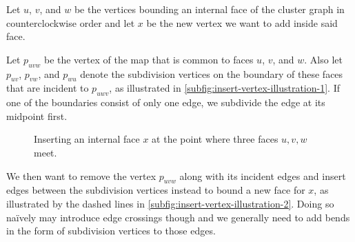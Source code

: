 Let $u$, $v$, and $w$ be the vertices bounding an internal face of the cluster graph in counterclockwise order and let $x$ be the new vertex we want to add inside said face.

Let $p_{uvw}$ be the vertex of the map  that is common to faces $u$, $v$, and $w$.
Also let $p_{uv}$, $p_{vw}$, and $p_{wu}$ denote the subdivision vertices on the boundary of these faces that are incident to $p_{uwv}$, as illustrated in \cref{subfig:insert-vertex-illustration-1}.
If one of the boundaries consist of only one edge, we subdivide the edge at its midpoint first.

\begin{figure}[H]
	\centering
	\quad
	\quad
	\caption{Inserting an internal face $x$ at the point where three faces $u,v,w$ meet.}
	\label{fig:insert-vertex-illustration}
\end{figure}

We then want to remove the vertex $p_{uvw}$ along with its incident edges and insert edges between the subdivision vertices instead to bound a new face for $x$, as illustrated by the dashed lines in \cref{subfig:insert-vertex-illustration-2}.
Doing so naïvely may introduce edge crossings though and we generally need to add bends in the form of subdivision vertices to those edges.

